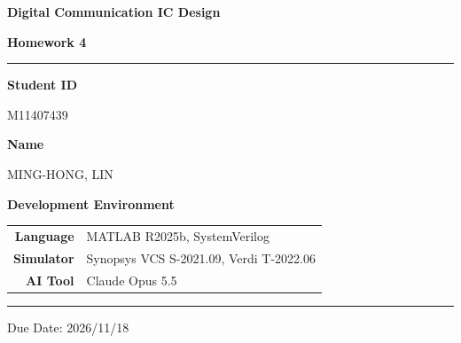 \documentclass[12pt,a4paper]{report}
\begin{document}
\pagestyle{plain}

\begin{titlepage}
\centering
\vspace*{3cm}

{\fontsize{28}{34}\selectfont\bfseries Digital Communication IC Design\par}
\vspace{0.6em}
{\fontsize{20}{26}\selectfont\bfseries Homework 4\par}

\vspace{1.5cm}
\textcolor{crimson}{\rule{0.6\linewidth}{1.2pt}}
\vspace{1.5cm}

{\large\bfseries Student ID}\par
\vspace{0.4em}
{\large M11407439}\par

\vspace{0.8em}

{\large\bfseries Name}\par
\vspace{0.4em}
{\large MING-HONG, LIN}\par

\vspace{2cm}

{\large\bfseries Development Environment}\par
\vspace{0.8em}
\begin{tabular}{rl}
    \textbf{Language} & MATLAB R2025b, SystemVerilog \\[4pt]
    \textbf{Simulator} & Synopsys VCS S-2021.09, Verdi T-2022.06 \\[4pt]
    \textbf{AI Tool}  & Claude Opus 5.5 \\
\end{tabular}

\vfill

\textcolor{crimson}{\rule{0.6\linewidth}{0.6pt}}\par
\vspace{0.5em}
{\small Due Date: 2026/11/18}

\end{titlepage}

\tableofcontents
\newpage
\end{document}
